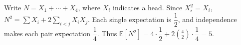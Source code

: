 Write $N=X_1+\cdots+X_4$, where $X_i$ indicates a head. Since $X_i^2=X_i$, $N^2=\sum X_i+2\sum_{i<j}X_iX_j$. Each single expectation is $\dfrac{1}{2}$, and independence makes each pair expectation $\dfrac{1}{4}$. Thus $\mathbb E[N^2]=4\cdot\dfrac{1}{2}+2\binom42\cdot\dfrac{1}{4}=\boxed5$.

